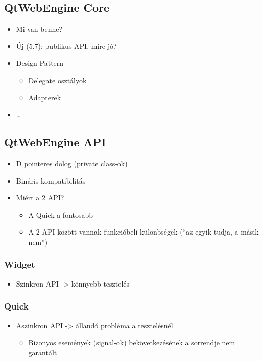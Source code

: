 \documentclass[12pt]{report}
\begin{document}
\subsection{QtWebEngine Core}
\begin{itemize}
    \item Mi van benne?
    \item Új (5.7): publikus API, mire jó?
    \item Design Pattern
        \begin{itemize}
            \item Delegate osztályok
            \item Adapterek
        \end{itemize}
    \item \dots
\end{itemize}

\subsection{QtWebEngine API}
\begin{itemize}
    \item D pointeres dolog (private class-ok)
    \item Bináris kompatibilitás
    \item Miért a 2 API?
    \begin{itemize}
        \item A Quick a fontosabb
        \item A 2 API között vannak funkcióbeli különbségek (``az egyik tudja, a másik nem'')
    \end{itemize}
\end{itemize}

\subsubsection{Widget}
\begin{itemize}
    \item Szinkron API -> könnyebb tesztelés
\end{itemize}

\subsubsection{Quick}
\begin{itemize}
    \item Aszinkron API -> állandó probléma a tesztelésnél
        \begin{itemize}
            \item Bizonyos események (signal-ok) bekövetkezésének a sorrendje nem garantált
        \end{itemize}
\end{itemize}
\end{document}
